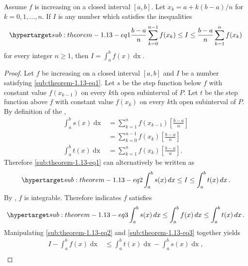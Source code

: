 \documentclass{report}
\begin{document}
  \begin{theorem}[1.13]
    Assume $f$ is increasing on a closed interval $[a, b]$.
    Let $x_k = a + k(b - a) / n$ for $k = 0, 1, \ldots, n$.
    If $I$ is any number which satisfies the inequalities
      \begin{equation}
        \hyperlabel{sub:theorem-1.13-eq1}
        \frac{b - a}{n} \sum_{k=0}^{n-1} f(x_k)
          \leq I \leq
          \frac{b - a}{n} \sum_{k=1}^n f(x_k)
      \end{equation}
      for every integer $n \geq 1$, then $I = \int_a^b f(x) \mathop{dx}$.
  \end{theorem}

  \begin{proof}
    Let $f$ be increasing on a closed interval $[a, b]$ and $I$ be a number
      satisfying \eqref{sub:theorem-1.13-eq1}.
    Let $s$ be the step function below $f$ with constant value $f(x_{k-1})$
      on every $k$th open subinterval of $P$.
    Let $t$ be the step function above $f$ with constant value $f(x_k)$
      on every $k$th open subinterval of $P$.
    By definition of the ,
      \begin{align*}
        \int_a^b s(x) \mathop{dx}
          & = \sum_{k=1}^n f(x_{k-1})\left[\frac{b - a}{n}\right] \\
          & = \sum_{k=0}^{n-1} f(x_k)\left[\frac{b - a}{n}\right] \\
        \int_a^b t(x) \mathop{dx}
          & = \sum_{k=1}^n f(x_k)\left[\frac{b - a}{n}\right].
      \end{align*}
    Therefore \eqref{sub:theorem-1.13-eq1} can alternatively be written as
      \begin{equation}
        \hyperlabel{sub:theorem-1.13-eq2}
        \int_a^b s(x) \mathop{dx} \leq I \leq \int_a^b t(x) \mathop{dx}.
      \end{equation}
    By , $f$ is integrable.
    Therefore  indicates $f$ satisfies
      \begin{equation}
        \hyperlabel{sub:theorem-1.13-eq3}
        \int_a^b s(x) \mathop{dx}
          \leq \int_a^b f(x) \mathop{dx}
          \leq \int_a^b t(x) \mathop{dx}.
      \end{equation}
    Manipulating \eqref{sub:theorem-1.13-eq2} and \eqref{sub:theorem-1.13-eq3}
      together yields
      \begin{align*}
        I - \int_a^b f(x) \mathop{dx}
          & \leq \int_a^b t(x) \mathop{dx} - \int_a^b s(x) \mathop{dx}, \\

\end{align*}
\end{proof}
\end{document}
